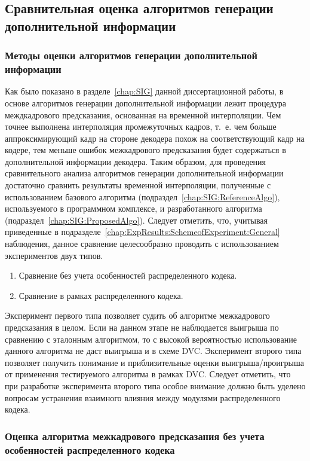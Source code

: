 \subsection{Сравнительная оценка алгоритмов генерации дополнительной информации}
\label{chap:ExpResults:SchemeofExperiment:SIG}

\subsubsection{Методы оценки алгоритмов генерации дополнительной информации}

Как было показано в разделе~\ref{chap:SIG} данной диссертационной работы, в основе алгоритмов генерации дополнительной информации лежит процедура междкадрового предсказания, основанная на временной интерполяции. Чем точнее выполнена интерполяция промежуточных кадров, т.~е. чем больше аппроксимирующий кадр на стороне декодера похож на соответствующий кадр на кодере, тем меньше ошибок межкадрового предсказания будет содержаться в дополнительной информации декодера. Таким образом, для проведения сравнительного анализа алгоритмов генерации дополнительной информации достаточно сравнить результаты временной интерполяции, полученные с использованием базового алгоритма (подраздел~\ref{chap:SIG:ReferenceAlgo}), используемого в программном комплексе, и разработанного алгоритма (подраздел~\ref{chap:SIG:ProposedAlgo}). Следует отметить, что, учитывая приведенные в подразделе~\ref{chap:ExpResults:SchemeofExperiment:General} наблюдения, данное сравнение целесообразно проводить с использованием экспериментов двух типов.
\begin{enumerate}
    \item Сравнение без учета особенностей распределенного кодека. 
    \item Сравнение в рамках распределенного кодека. 
\end{enumerate}
Эксперимент первого типа позволяет судить об алгоритме межкадрового предсказания в целом. Если на данном этапе не наблюдается выигрыша по сравнению с эталонным алгоритмом, то с высокой вероятностью использование данного алгоритма не даст выигрыша и в схеме DVC. Эксперимент второго типа позволяет получить понимание и приблизительные оценки выигрыша/проигрыша от применения тестируемого алгоритма в рамках DVC. Следует отметить, что при разработке эксперимента второго типа особое внимание должно быть уделено вопросам устранения взаимного влияния между модулями распределенного кодека.

\subsubsection{Оценка алгоритма межкадрового предсказания без учета особенностей распределенного кодека}

